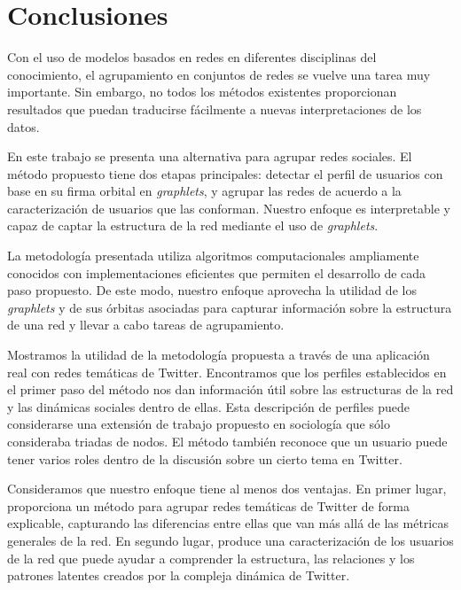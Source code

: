 
\chapter{Conclusiones}
\label{chapter:6}

Con el uso de modelos basados en redes en diferentes disciplinas del conocimiento, el agrupamiento en conjuntos de redes se vuelve una tarea muy importante. Sin embargo, no todos los métodos existentes proporcionan resultados que puedan traducirse fácilmente a nuevas interpretaciones de los datos. 

En este trabajo se presenta una alternativa para agrupar redes sociales. El método propuesto tiene dos etapas principales: detectar el perfil de usuarios con base en su firma orbital en \textit{graphlets}, y agrupar las redes de acuerdo a la caracterización de usuarios que las conforman. Nuestro enfoque es interpretable y capaz de captar la estructura de la red mediante el uso de \textit{graphlets}. 

La metodología presentada utiliza algoritmos computacionales ampliamente conocidos con implementaciones eficientes que permiten el desarrollo de cada paso propuesto. De este modo, nuestro enfoque aprovecha la utilidad de los \textit{graphlets} y de sus órbitas asociadas para capturar información sobre la estructura de una red y llevar a cabo tareas de agrupamiento.
 
Mostramos la utilidad de la metodología propuesta a través de una aplicación real con redes temáticas de Twitter. Encontramos que los perfiles establecidos en el primer paso del método nos dan información útil sobre las estructuras de la red y las dinámicas sociales dentro de ellas. Esta descripción de perfiles puede considerarse una extensión de trabajo propuesto en sociología que sólo consideraba triadas de nodos. El método también reconoce que un usuario puede tener varios roles dentro de la discusión sobre un cierto tema en Twitter. 

Consideramos que nuestro enfoque tiene al menos dos ventajas. En primer lugar, proporciona un método para agrupar redes temáticas de Twitter de forma explicable, capturando las diferencias entre ellas que van más allá de las métricas generales de la red. En segundo lugar, produce una caracterización de los usuarios de la red que puede ayudar a comprender la estructura, las relaciones y los patrones latentes creados por la compleja dinámica de Twitter. 


